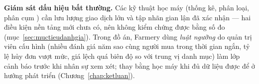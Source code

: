 \textbf{Giám sát dấu hiệu bất thường.} Các kỹ thuật học máy (thống kê, phân loại, phân cụm \parencite{chandola2009anomaly}) cần lưu lượng giao dịch lớn và tập nhãn gian lận đã xác nhận --- hai điều kiện nền tảng mới chưa có, nên không kiểm chứng được bằng số đo (mục~\ref{sec:muctieudanhgia}). Trong đồ án, Farmery dùng \emph{luật ngưỡng} do quản trị viên cấu hình (nhiều đánh giá năm sao cùng người mua trong thời gian ngắn, tỷ lệ hủy đơn vượt mức, giá lệch quá biên độ so với trung vị danh mục) làm lớp cảnh báo trước khi nhân sự xem xét; thay bằng học máy khi đủ dữ liệu được để ở hướng phát triển (Chương~\ref{chap:ketluan}).
